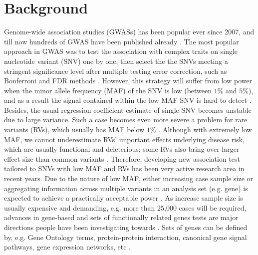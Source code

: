 \documentclass[12pt]{article}
\begin{document}
\section{Background}\label{sec:background}
\doublespacing
Genome-wide association studies (GWASs) has been popular ever since 2007, and till now hundreds of GWAS have been published already \cite{McCarthy2008}. The most popular approach in GWAS was to test the association with complex traits on single nucleotide variant (SNV) one by one, then select the the SNVs meeting a stringent significance level after multiple testing error correction, such as Bonferroni and FDR methods \cite{McCarthy2008,Hirschhorn2005}. However, this strategy will suffer from low power when the minor allele frequency (MAF) of the SNV is low (between $1\%$ and $5\%$), and as a result the signal contained within the low MAF SNV is hard to detect \cite{Sham2014}. Besides, the usual regression coefficient estimate of single SNV becomes unstable due to large variance\cite{Sham2014}. Such a case becomes even more severe a problem for rare variants (RVs), which usually has MAF below $1\%$ \cite{Bansal2010}. Although with extremely low MAF, we cannot underestimate RVs' important effects underlying disease risk, which are usually functional and deleterious; some RVs also bring over larger effect size than common variants \cite{Fu2013,Bansal2010,Sham2014,McCarthy2008}. Therefore, developing new association test tailored to SNVs with low MAF and RVs has been very active research area in recent years. Due to the nature of low MAF, either increasing case sample size or aggregating information across multiple variants in an analysis set (e.g. gene) is expected to achieve a practically acceptable power \cite{Capanu2011,Basu2011,Bansal2010,Sham2014}. As increase sample size is usually expensive and demanding, e.g. more than 25,000 cases will be required, advances in gene-based and sets of functionally related genes tests are major directions people have been investigating towards \cite{Ye2011,Pinto2010,Sham2014}. Sets of genes can be defined by, e.g. Gene Ontology terms, protein-protein interaction, canonical gene signal pathways, gene expression networks, etc \cite{Sham2014,DelaCruz2010,Weng2011,Wang2010}.
\end{document}
